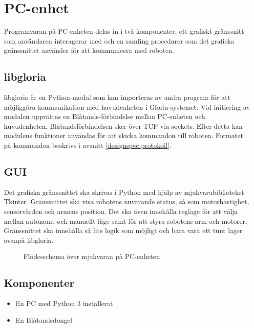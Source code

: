 \section{PC-enhet}
Programvaran på PC-enheten delas in i två komponenter, ett grafiskt gränssnitt som användaren interagerar med och en samling procedurer som det grafiska gränssnittet använder för att kommunicera med roboten.

\subsection{libgloria}
libgloria är en Python-modul som kan importeras av andra program för att möjliggöra kommunikation med huvudenheten i Gloria-systemet. Vid initiering av modulen upprättas en Blåtands-förbindelse mellan PC-enheten och huvudenheten. Blåtandsförbindelsen sker över TCP via sockets. Efter detta kan modulens funktioner användas för att skicka kommandon till roboten. Formatet på kommandon beskrivs i avsnitt \ref{designspec:protokoll}.

\subsection{GUI}
Det grafiska gränssnittet ska skrivas i Python med hjälp av mjukvarubiblioteket Tkinter. Gränssnittet ska visa robotens nuvarande status, så som motorhastighet, sensorvärden och armens position. Det ska även innehålla reglage för att välja mellan autonomt och manuellt läge samt för att styra robotens arm och motorer. Gränssnittet ska innehålla så lite logik som möjligt och bara vara ett tunt lager ovanpå libgloria.

\begin{figure}[h]
  \centerline{\scalebox{0.8}{}}
  \caption{Flödesschema över mjukvaran på PC-enheten}
\end{figure}

\subsection{Komponenter}
\begin{itemize}
\item En PC med Python 3 installerat
\item En Blåtandsdongel
\end{itemize}
